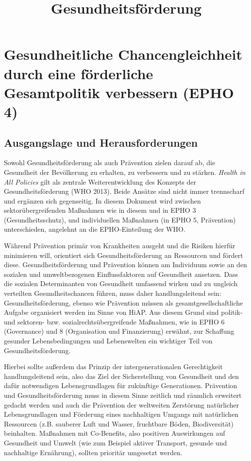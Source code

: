 \documentclass{article}
\begin{document}
\title{Gesundheitsförderung}

\maketitle


\section{Gesundheitliche Chancengleichheit durch eine förderliche Gesamtpolitik verbessern (EPHO 4)}\label{H1266352}



\subsection{Ausgangslage und Herausforderungen}\label{H3393909}



Sowohl Gesundheitsförderung als auch Prävention zielen darauf ab, die Gesundheit der Bevölkerung zu erhalten, zu verbessern und zu stärken. \emph{Health in All Policies }gilt als zentrale Weiterentwicklung des Konzepts der Gesundheitsförderung (WHO 2013). Beide Ansätze sind nicht immer trennscharf und ergänzen sich gegenseitig. In diesem Dokument wird zwischen sektorübergreifenden Maßnahmen wie in diesem und in EPHO 3 (Gesundheitsschutz), und individuellen Maßnahmen (in EPHO 5, Prävention) unterschieden, angelehnt an die EPHO-Einteilung der WHO.


Während Prävention primär von Krankheiten ausgeht und die Risiken hierfür minimieren will, orientiert sich Gesundheitsförderung an Ressourcen und fördert diese. Gesundheitsförderung und Prävention können am Individuum sowie an den sozialen und umweltbezogenen Einflussfaktoren auf Gesundheit ansetzen. Dass die sozialen Determinanten von Gesundheit umfassend wirken und zu\textbf{ }ungleich verteilten Ge­sund­heitschancen führen, muss daher handlungsleitend sein: Gesundheitsförderung, ebenso wie Prävention müssen als gesamtgesellschaftliche Aufgabe organisiert werden im Sinne von HiAP. Aus diesem Grund sind politik- und sektoren- bzw. sozialrechtsübergreifende Maßnahmen, wie in EPHO 6 (Governance) und 8 (Organisation und Finanzierung) erwähnt, zur Schaffung gesunder Lebensbedingungen und Lebenswelten ein wichtiger Teil von Gesundheitsförderung. 


Hierbei sollte außerdem das Prinzip der intergenerationalen Gerechtigkeit handlungsleitend sein, also das Ziel der Sicherstellung von Gesundheit und den dafür notwendigen Lebensgrundlagen für zukünftige Generationen. Prävention und Gesundheitsförderung muss in diesem Sinne zeitlich und räumlich erweitert gedacht werden und auch die Prävention der weltweiten Zerstörung natürlicher Lebensgrundlagen und Förderung eines nachhaltigen Umgangs mit natürlichen Ressourcen (z.B. sauberer Luft und Wasser, fruchtbare Böden, Biodiversität) beinhalten. Maßnahmen mit Co-Benefits, also positiven Auswirkungen auf Gesundheit und Umwelt (wie zum Beispiel aktiver Transport, gesunde und nachhaltige Ernährung), sollten prioritär umgesetzt werden.
\end{document}
